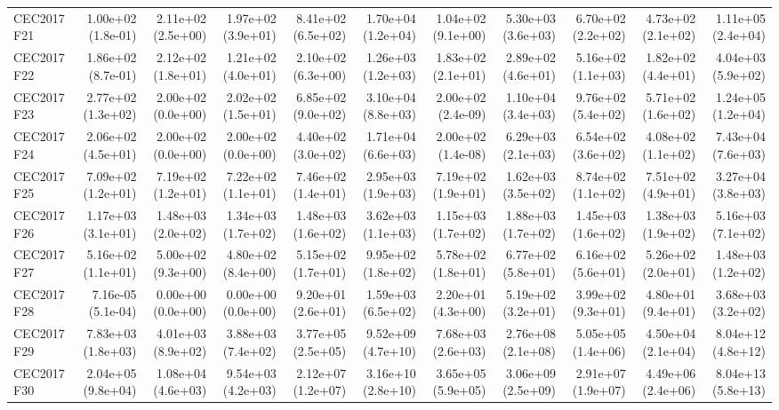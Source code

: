 \begin{longtable}{lrrrrrrrrrr}
CEC2017 F21 & 1.00e+02 (1.8e-01) & 2.11e+02 (2.5e+00) & 1.97e+02 (3.9e+01) & 8.41e+02 (6.5e+02) & 1.70e+04 (1.2e+04) & 1.04e+02 (9.1e+00) & 5.30e+03 (3.6e+03) & 6.70e+02 (2.2e+02) & 4.73e+02 (2.1e+02) & 1.11e+05 (2.4e+04) \\
CEC2017 F22 & 1.86e+02 (8.7e-01) & 2.12e+02 (1.8e+01) & 1.21e+02 (4.0e+01) & 2.10e+02 (6.3e+00) & 1.26e+03 (1.2e+03) & 1.83e+02 (2.1e+01) & 2.89e+02 (4.6e+01) & 5.16e+02 (1.1e+03) & 1.82e+02 (4.4e+01) & 4.04e+03 (5.9e+02) \\
CEC2017 F23 & 2.77e+02 (1.3e+02) & 2.00e+02 (0.0e+00) & 2.02e+02 (1.5e+01) & 6.85e+02 (9.0e+02) & 3.10e+04 (8.8e+03) & 2.00e+02 (2.4e-09) & 1.10e+04 (3.4e+03) & 9.76e+02 (5.4e+02) & 5.71e+02 (1.6e+02) & 1.24e+05 (1.2e+04) \\
CEC2017 F24 & 2.06e+02 (4.5e+01) & 2.00e+02 (0.0e+00) & 2.00e+02 (0.0e+00) & 4.40e+02 (3.0e+02) & 1.71e+04 (6.6e+03) & 2.00e+02 (1.4e-08) & 6.29e+03 (2.1e+03) & 6.54e+02 (3.6e+02) & 4.08e+02 (1.1e+02) & 7.43e+04 (7.6e+03) \\
CEC2017 F25 & 7.09e+02 (1.2e+01) & 7.19e+02 (1.2e+01) & 7.22e+02 (1.1e+01) & 7.46e+02 (1.4e+01) & 2.95e+03 (1.9e+03) & 7.19e+02 (1.9e+01) & 1.62e+03 (3.5e+02) & 8.74e+02 (1.1e+02) & 7.51e+02 (4.9e+01) & 3.27e+04 (3.8e+03) \\
CEC2017 F26 & 1.17e+03 (3.1e+01) & 1.48e+03 (2.0e+02) & 1.34e+03 (1.7e+02) & 1.48e+03 (1.6e+02) & 3.62e+03 (1.1e+03) & 1.15e+03 (1.7e+02) & 1.88e+03 (1.7e+02) & 1.45e+03 (1.6e+02) & 1.38e+03 (1.9e+02) & 5.16e+03 (7.1e+02) \\
CEC2017 F27 & 5.16e+02 (1.1e+01) & 5.00e+02 (9.3e+00) & 4.80e+02 (8.4e+00) & 5.15e+02 (1.7e+01) & 9.95e+02 (1.8e+02) & 5.78e+02 (1.8e+01) & 6.77e+02 (5.8e+01) & 6.16e+02 (5.6e+01) & 5.26e+02 (2.0e+01) & 1.48e+03 (1.2e+02) \\
CEC2017 F28 & 7.16e-05 (5.1e-04) & 0.00e+00 (0.0e+00) & 0.00e+00 (0.0e+00) & 9.20e+01 (2.6e+01) & 1.59e+03 (6.5e+02) & 2.20e+01 (4.3e+00) & 5.19e+02 (3.2e+01) & 3.99e+02 (9.3e+01) & 4.80e+01 (9.4e+01) & 3.68e+03 (3.2e+02) \\
CEC2017 F29 & 7.83e+03 (1.8e+03) & 4.01e+03 (8.9e+02) & 3.88e+03 (7.4e+02) & 3.77e+05 (2.5e+05) & 9.52e+09 (4.7e+10) & 7.68e+03 (2.6e+03) & 2.76e+08 (2.1e+08) & 5.05e+05 (1.4e+06) & 4.50e+04 (2.1e+04) & 8.04e+12 (4.8e+12) \\
CEC2017 F30 & 2.04e+05 (9.8e+04) & 1.08e+04 (4.6e+03) & 9.54e+03 (4.2e+03) & 2.12e+07 (1.2e+07) & 3.16e+10 (2.8e+10) & 3.65e+05 (5.9e+05) & 3.06e+09 (2.5e+09) & 2.91e+07 (1.9e+07) & 4.49e+06 (2.4e+06) & 8.04e+13 (5.8e+13) \\

\end{longtable}
